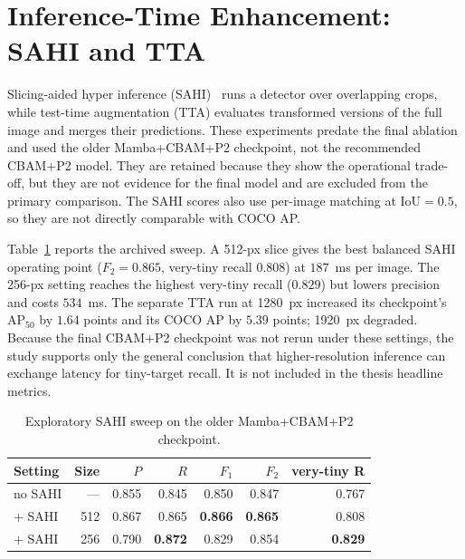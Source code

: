 \section{Inference-Time Enhancement: SAHI and TTA}
\label{sec:sahitta}
Slicing-aided hyper inference (SAHI)~\cite{akyon2022sahi} runs a detector over
overlapping crops, while test-time augmentation (TTA) evaluates transformed
versions of the full image and merges their predictions. These experiments
predate the final ablation and used the older Mamba+CBAM+P2 checkpoint, not the
recommended CBAM+P2 model. They are retained because they show the operational
trade-off, but they are not evidence for the final model and are excluded from
the primary comparison. The SAHI scores also use per-image matching at
$\mathrm{IoU}=0.5$, so they are not directly comparable with COCO AP.

Table~\ref{tab:sahi} reports the archived sweep. A 512-px slice gives the best
balanced SAHI operating point ($F_2=0.865$, very-tiny recall $0.808$) at
$187$~ms per image. The 256-px setting reaches the highest very-tiny recall
($0.829$) but lowers precision and costs $534$~ms. The separate TTA run at
1280~px increased its checkpoint's $\mathrm{AP}_{50}$ by $1.64$ points and
its COCO AP by $5.39$ points; 1920~px degraded. Because the final CBAM+P2
checkpoint was not rerun under these settings, the study supports only the
general conclusion that higher-resolution inference can exchange latency for
tiny-target recall. It is not included in the thesis headline metrics.

\begin{table}[tbp]
  \centering
  \caption{Exploratory SAHI sweep on the older Mamba+CBAM+P2 checkpoint.}
  \label{tab:sahi}
  \setlength{\tabcolsep}{5pt}
  \begin{tabular}{@{}l r r r r r r@{}}
    \toprule
    \bfseries\boldmath Setting& \bfseries\boldmath Size& \bfseries\boldmath $P$& \bfseries\boldmath $R$& \bfseries\boldmath $F_1$& \bfseries\boldmath $F_2$& \bfseries\boldmath very-tiny R\\
    \midrule
    no SAHI & --- & 0.855 & 0.845 & 0.850 & 0.847 & 0.767 \\
    + SAHI  & 512 & 0.867 & 0.865 & \textbf{0.866} & \textbf{0.865} & 0.808 \\
    + SAHI  & 256 & 0.790 & \textbf{0.872} & 0.829 & 0.854 & \textbf{0.829} \\
    \bottomrule
  \end{tabular}
\end{table}

